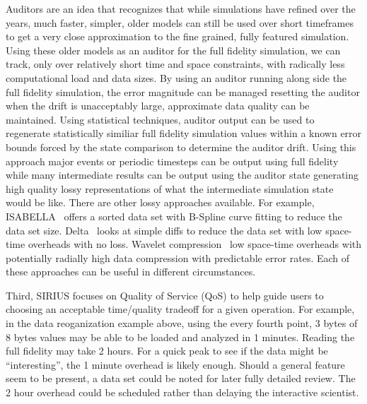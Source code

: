 Auditors are an idea that recognizes that while simulations have refined over
the years, much faster, simpler, older models can still be used over short
timeframes to get a very close approximation to the fine grained, fully
featured simulation. Using these older models as an auditor for the full
fidelity simulation, we can track, only over relatively short time and space
constraints, with radically less computational load and data sizes. By using an
auditor running along side the full fidelity simulation, the error magnitude
can be managed resetting the auditor when the drift is unacceptably large,
approximate data quality can be maintained. Using statistical techniques,
auditor output can be used to regenerate statistically similiar full fidelity
simulation values within a known error bounds forced by the state comparison to
determine the auditor drift. Using this approach major events or periodic
timesteps can be output using full fidelity while many intermediate results can
be output using the auditor state generating high quality lossy representations
of what the intermediate simulation state would be like. There are other lossy
approaches available. For example, ISABELLA~\cite{isabella} offers a sorted
data set with B-Spline curve fitting to reduce the data set size.
Delta~\cite{delta} looks at simple diffs to reduce the data set with low
space-time overheads with no loss. Wavelet compression~\cite{wavelet} low
space-time overheads with potentially radially high data compression with
predictable error rates. Each of these approaches can be useful in different
circumstances.

Third, SIRIUS focuses on Quality of Service (QoS) to help guide users to
choosing an acceptable time/quality tradeoff for a given operation. For
example, in the data reoganization example above, using the every fourth point,
3 bytes of 8 bytes values may be able to be loaded and analyzed in 1 minutes.
Reading the full fidelity may take 2 hours. For a quick peak to see if the data
might be ``interesting'', the 1 minute overhead is likely enough. Should a
general feature seem to be present, a data set could be noted for later fully
detailed review. The 2 hour overhead could be scheduled rather than delaying
the interactive scientist.

